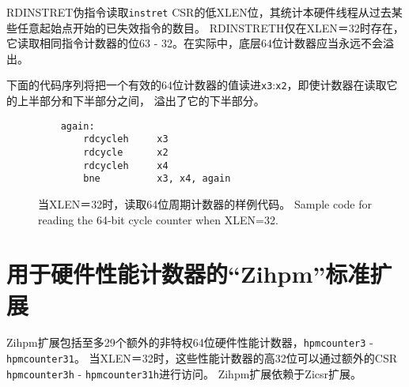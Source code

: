 RDINSTRET伪指令读取{\tt instret} CSR的低XLEN位，其统计本硬件线程从过去某些任意起始点开始的已失效指令的数目。
RDINSTRETH仅在XLEN＝32时存在，它读取相同指令计数器的位63 - 32。在实际中，底层64位计数器应当永远不会溢出。


下面的代码序列将把一个有效的64位计数器的值读进{\tt x3}:{\tt x2}，即使计数器在读取它的上半部分和下半部分之间，
溢出了它的下半部分。

\begin{figure}[h!]
\begin{center}
\begin{verbatim}
    again:
        rdcycleh     x3
        rdcycle      x2
        rdcycleh     x4
        bne          x3, x4, again
\end{verbatim}
\end{center}
\caption{当XLEN＝32时，读取64位周期计数器的样例代码。  Sample code for reading the 64-bit cycle counter when XLEN=32.}
\label{rdcycle}
\end{figure}

\section{用于硬件性能计数器的“Zihpm”标准扩展}

Zihpm扩展包括至多29个额外的非特权64位硬件性能计数器，{\tt hpmcounter3} - {\tt hpmcounter31}。
当XLEN＝32时，这些性能计数器的高32位可以通过额外的CSR {\tt hpmcounter3h} - {\tt hpmcounter31h}进行访问。
Zihpm扩展依赖于Zicsr扩展。

